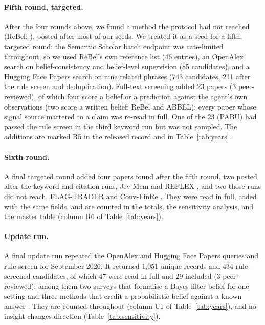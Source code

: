 \paragraph{Fifth round, targeted.}
After the four rounds above, we found a method the protocol had not reached (ReBel; \citealp{tang2026rewarding}), posted after most of our seeds. We treated it as a seed for a fifth, targeted round: the Semantic Scholar batch endpoint was rate-limited throughout, so we used ReBel's own reference list (46 entries), an OpenAlex search on belief-consistency and belief-level supervision (85 candidates), and a Hugging Face Papers search on nine related phrases (743 candidates, 211 after the rule screen and deduplication). Full-text screening added 23 papers (3 peer-reviewed), of which four score a belief or a prediction against the agent's own observations (two score a written belief: ReBel and ABBEL); every paper whose signal source mattered to a claim was re-read in full. One of the 23 (PABU) had passed the rule screen in the third keyword run but was not sampled. The additions are marked R5 in the released record and in Table~\ref{tab:years}.

\paragraph{Sixth round.}
A final targeted round added four papers found after the fifth round, two posted after the keyword and citation runs, Jev-Mem and REFLEX \citep{jiang2026jevmem,wu2026reflex}, and two those runs did not reach, FLAG-TRADER and Conv-FinRe \citep{xiong2025flagtrader,wang2026convfinre}. They were read in full, coded with the same fields, and are counted in the totals, the sensitivity analysis, and the master table (column R6 of Table~\ref{tab:years}).

\paragraph{Update run.}
A final update run repeated the OpenAlex and Hugging Face Papers queries and rule screen for September 2026. It returned 1{,}051 unique records and 434 rule-screened candidates, of which 47 were read in full and 29 included (3 peer-reviewed): among them two surveys that formalise a Bayes-filter belief for one setting \citep{cai2026complex,tang2026proactive} and three methods that credit a probabilistic belief against a known answer \citep{zhang2026toward,wang2026gavel,hu2026infinite}. They are counted throughout (column U1 of Table~\ref{tab:years}), and no insight changes direction (Table~\ref{tab:sensitivity}).

